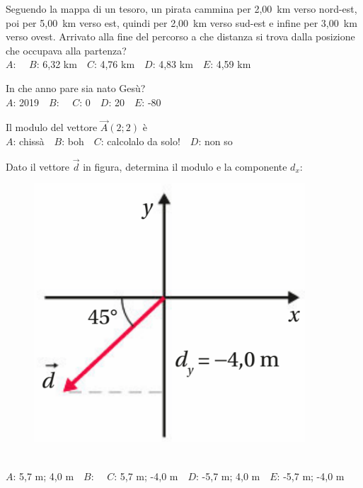\mcquestionheader Seguendo la mappa di un tesoro, un pirata cammina per 2,00~km verso nord-est, poi per 5,00~km verso est, quindi per 2,00~km verso sud-est e infine per 3,00~km verso ovest. Arrivato alla fine del percorso a che distanza si trova dalla posizione che occupava alla partenza?\\
{$A$}: \ \ {$B$}: 6,32 km\ \ {$C$}: 4,76 km\ \ {$D$}: 4,83 km\ \ {$E$}: 4,59 km\ \ 

\mcquestionfooter



\def\mcquestionnumber{7}


\mcquestionheader In che anno pare sia nato Gesù?\\
{$A$}: 2019\ \ {$B$}: \ \ {$C$}: 0\ \ {$D$}: 20\ \ {$E$}: -80\ \ 

\mcquestionfooter



\def\mcquestionnumber{8}


\mcquestionheader Il modulo del vettore $\vec{A}(2;2)$ è\\
{$A$}: chissà\ \ {$B$}: boh\ \ {$C$}: calcolalo da solo!\ \ {$D$}: non so\ \ 

\mcquestionfooter



\def\mcquestionnumber{9}


\mcquestionheader Dato il vettore $\vec{d}$ in figura, determina il modulo e la componente $d_x$: \begin{figure}[h!]   \begin{center}     \includegraphics[scale=0.35]{vettored.png}   \end{center} \end{figure}\\
{$A$}: 5,7 m; 4,0 m\ \ {$B$}: \ \ {$C$}: 5,7 m; -4,0 m\ \ {$D$}: -5,7 m; 4,0 m\ \ {$E$}: -5,7 m; -4,0 m\ \ 

